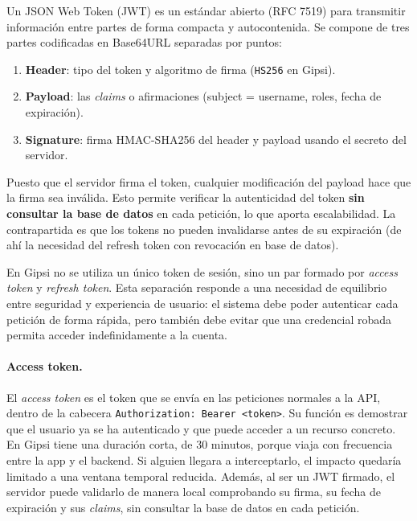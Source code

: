 \documentclass[12pt,a4paper,twoside]{report}
\begin{document}
\begin{tcolorbox}[definicionStyle, title={¿Qué es un JSON Web Token?}]
Un JSON Web Token (JWT) es un estándar abierto (RFC 7519) para transmitir información entre partes de forma compacta y autocontenida. Se compone de tres partes codificadas en Base64URL separadas por puntos:

\begin{enumerate}
  \item \textbf{Header}: tipo del token y algoritmo de firma (\texttt{HS256} en Gipsi).
  \item \textbf{Payload}: las \textit{claims} o afirmaciones (subject = username, roles, fecha de expiración).
  \item \textbf{Signature}: firma HMAC-SHA256 del header y payload usando el secreto del servidor.
\end{enumerate}

Puesto que el servidor firma el token, cualquier modificación del payload hace que la firma sea inválida. Esto permite verificar la autenticidad del token \textbf{sin consultar la base de datos} en cada petición, lo que aporta escalabilidad. La contrapartida es que los tokens no pueden invalidarse antes de su expiración (de ahí la necesidad del refresh token con revocación en base de datos).
\end{tcolorbox}

En Gipsi no se utiliza un único token de sesión, sino un par formado por
\textit{access token} y \textit{refresh token}. Esta separación responde a una
necesidad de equilibrio entre seguridad y experiencia de usuario: el sistema
debe poder autenticar cada petición de forma rápida, pero también debe evitar
que una credencial robada permita acceder indefinidamente a la cuenta.

\paragraph{Access token.} El \textit{access token} es el token que se envía en
las peticiones normales a la API, dentro de la cabecera
\texttt{Authorization: Bearer <token>}. Su función es demostrar que el usuario
ya se ha autenticado y que puede acceder a un recurso concreto. En Gipsi tiene
una duración corta, de 30 minutos, porque viaja con frecuencia entre la app y el
backend. Si alguien llegara a interceptarlo, el impacto quedaría limitado a una
ventana temporal reducida. Además, al ser un JWT firmado, el servidor puede
validarlo de manera local comprobando su firma, su fecha de expiración y sus
\textit{claims}, sin consultar la base de datos en cada petición.
\end{document}
